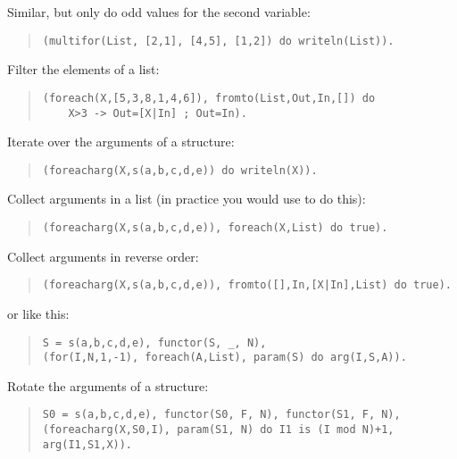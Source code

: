 Similar, but only do odd values for the second variable:
\begin{quote}
\begin{verbatim}
(multifor(List, [2,1], [4,5], [1,2]) do writeln(List)).
\end{verbatim}
\end{quote}

Filter the elements of a list:
\begin{quote}
\begin{verbatim}
(foreach(X,[5,3,8,1,4,6]), fromto(List,Out,In,[]) do
    X>3 -> Out=[X|In] ; Out=In).
\end{verbatim}
\end{quote}

Iterate over the arguments of a structure:
\begin{quote}
\begin{verbatim}
(foreacharg(X,s(a,b,c,d,e)) do writeln(X)).
\end{verbatim}
\end{quote}

Collect arguments in a list
(in practice you would use  to do this):
\begin{quote}
\begin{verbatim}
(foreacharg(X,s(a,b,c,d,e)), foreach(X,List) do true).
\end{verbatim}
\end{quote}

Collect arguments in reverse order:
\begin{quote}
\begin{verbatim}
(foreacharg(X,s(a,b,c,d,e)), fromto([],In,[X|In],List) do true).
\end{verbatim}
\end{quote}
or like this:
\begin{quote}
\begin{verbatim}
S = s(a,b,c,d,e), functor(S, _, N),
(for(I,N,1,-1), foreach(A,List), param(S) do arg(I,S,A)).
\end{verbatim}
\end{quote}

Rotate the arguments of a structure:
\begin{quote}
\begin{verbatim}
S0 = s(a,b,c,d,e), functor(S0, F, N), functor(S1, F, N),
(foreacharg(X,S0,I), param(S1, N) do I1 is (I mod N)+1, arg(I1,S1,X)).
\end{verbatim}
\end{quote}

